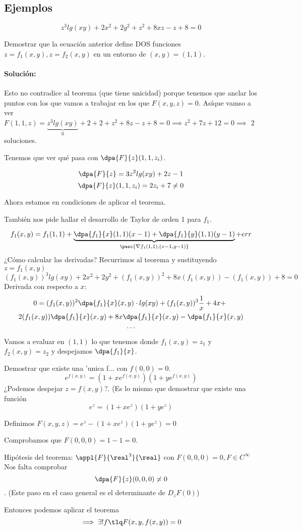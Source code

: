 \subsection{Ejemplos}
\begin{example}

$$z^3lg(xy) + 2x^2 + 2y^2 +z^2 + 8xz - z + 8 =0$$

Demostrar que la ecuación anterior define DOS funciones $z = f_1(x,y), z = f_2(x,y)$ en un entorno de $(x,y)=(1,1)$.

\paragraph{Solución: }

Esto no contradice al teorema (que tiene unicidad) porque tenemos que anclar los puntos con los que vamos a trabajar en los que $F(x,y,z) = 0$. Asíque vamso a ver $F(1,1,z) = \underbrace{z^3lg(xy)}_{0} + 2 + 2 + z^2 + 8z -z +8 = 0 \implies z^2+7z+12 = 0 \implies $ 2 soluciones.

Tenemos que ver qué pasa con $\displaystyle \dpa{F}{z}(1,1,z_i)$.

\[\dpa{F}{z} = 3z^2lg(xy) + 2z -1\]
\[\dpa{F}{z}(1,1,z_i) = 2z_i + 7 \neq 0\]

Ahora estamos en condiciones de aplicar el teorema.

También nos pide hallar el desarrollo de Taylor de orden 1 para $f_1$.

\[f_1(x,y) = f_1(1,1) + \underbrace{\dpa{f_1}{x}(1,1)(x-1) + \dpa{f_1}{y}(1,1) (y-1)}_{\pesc{\nabla f_1(1,1),(x-1,y-1)}} + err\]
¿Cómo calcular las derivadas? Recurrimos al teorema y sustituyendo $z=f_1(x,y)$
\[(f_1(x,y))^3 lg(xy) + 2x^2 + 2y^2 + (f_1(x,y))^2 + 8x(f_1(x,y))-(f_1(x,y))+8 = 0\]
Derivada con respecto a $x$:
\begin{gather*}
 0 = (f_1(x,y))^2\dpa{f_1}{x}(x,y)\cdot lg(xy) + (f_1(x,y))^3 \frac{1}{x}+4x + \\ 2(f_1(x,y))\dpa{f_1}{x}(x,y) + 8x\dpa{f_1}{x}(x,y) - \dpa{f_1}{x}(x,y) \\
 \dotsb
 \end{gather*}
Vamos a evaluar en $(1,1)$ lo que tenemos donde $f_1(x,y) = z_1$ y $f_2(x,y) = z_2$ y despejamos $\dpa{f_1}{x}$.
\end{example}

\begin{example}

Demostrar que existe una 'unica f... con $f(0,0) = 0$.
$$e^{f(x,y)} = (1+xe^{f(x,y)})(1+ye^{f(x,y)})$$
¿Podemos despejar $z = f(x,y)$?. (Es lo mismo que demostrar que existe una función $$e^{z} = (1+xe^z)(1+ye^z)$$

Definimos $F(x,y,z) = e^z - (1+xe^z)(1+ye^z) = 0$

Comprobamos que $F(0,0,0) = 1-1 = 0$.

Hipótesis del teorema: $\appl{F}{\real^3}{\real}$ con $F(0,0,0) = 0, F \in C^{\infty}$
Nos falta comprobar \[\dpa{F}{z}(0,0,0) \neq 0\]. (Este paso en el caso general es el determinante de $D_zF(0)$)

Entonces podemos aplicar el teorema
\[\implies \exists ! f \tlq F(x,y,f(x,y)) = 0\]
\end{example}

